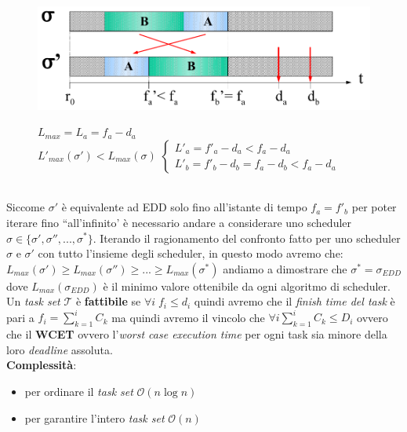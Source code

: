 \begin{figure}[h]
    \centering
    \begin{minipage}[t]{0.45\textwidth}
        \centering
        \includegraphics[width=\textwidth]{img/edd_opt}
    \end{minipage}
    \begin{minipage}[t]{0.45\textwidth}
        \centering
        $L_{max} = L_a = f_a - d_a$ \\ 
        $L'_{max}(\sigma') < L_{max}(\sigma)$
        \begin{math}
            \begin{cases}
                L'_a = f'_a - d_a < f_a - d_a \\
                L'_b = f'_b - d_b = f_a - d_b < f_a - d_a
            \end{cases}
        \end{math}
    \end{minipage}
\end{figure}
\\
Siccome $\sigma'$ è equivalente ad EDD solo fino all'istante di tempo $f_a = f'_b$ per poter iterare fino ``all'infinito' è necessario andare a considerare uno scheduler $\sigma \in \{\sigma', \sigma'', ..., \sigma^*\}$. Iterando il ragionamento del confronto fatto per uno scheduler $\sigma$ e $\sigma'$ con tutto l'insieme degli scheduler, in questo modo avremo che: $L_{max}(\sigma') \geq L_{max}(\sigma'') \geq ... \geq L_{max}(\sigma^*)$ andiamo a dimostrare che $\sigma^* = \sigma_{EDD}$ dove $L_{max}(\sigma_{EDD})$ è il minimo valore ottenibile da ogni algoritmo di scheduler. \\
Un \textit{task set} $\mathcal{T}$ è \textbf{fattibile} se $\forall i \; f_i \leq d_i$ quindi avremo che il \textit{finish time del task} è pari a $f_i = \sum_{k = 1}^i C_k$ ma quindi avremo il vincolo che $\forall i \sum_{k = 1}^i C_k \leq D_i$ ovvero che il \textbf{WCET} ovvero l'\textit{worst case execution time} per ogni task sia minore della loro \textit{deadline} assoluta. \\
\textbf{Complessità}:
\begin{itemize}
    \item per ordinare il \textit{task set} $\mathcal{O}(n \log n)$
    \item per garantire l'intero \textit{task set} $\mathcal{O}(n)$
\end{itemize}


